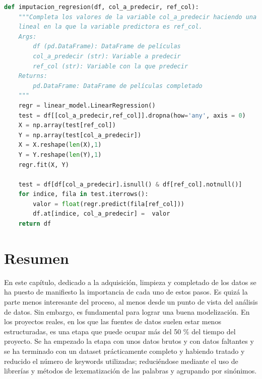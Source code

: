 \begin{lstlisting}[language=Python, caption={Imputación de una variable mediante regresión lineal con otra.}, label ={lst:linreg}]
 def imputacion_regresion(df, col_a_predecir, ref_col):
    """Completa los valores de la variable col_a_predecir haciendo una regresión
    lineal en la que la variable predictora es ref_col.
    Args:
        df (pd.DataFrame): DataFrame de películas
        col_a_predecir (str): Variable a predecir
        ref_col (str): Variable con la que predecir
    Returns:
        pd.DataFrame: DataFrame de películas completado
    """
    regr = linear_model.LinearRegression()
    test = df[[col_a_predecir,ref_col]].dropna(how='any', axis = 0)
    X = np.array(test[ref_col])
    Y = np.array(test[col_a_predecir])
    X = X.reshape(len(X),1)
    Y = Y.reshape(len(Y),1)
    regr.fit(X, Y)

    test = df[df[col_a_predecir].isnull() & df[ref_col].notnull()]
    for indice, fila in test.iterrows():
        valor = float(regr.predict(fila[ref_col]))
        df.at[indice, col_a_predecir] =  valor
    return df
\end{lstlisting}

\section{Resumen}

En este capítulo, dedicado a la adquisición, limpieza y completado de los datos se ha puesto de manifiesto la importancia de cada uno de estos pasos. Es quizá la parte menos interesante del proceso, al menos desde un punto de vista del análisis de datos. Sin embargo, es fundamental para lograr una buena modelización. En los proyectos reales, en los que las fuentes de datos suelen estar menos estructuradas, es una etapa que puede ocupar más del 50 \% del tiempo del proyecto. Se ha empezado la etapa con unos datos brutos y con datos faltantes y se ha terminado con un dataset prácticamente completo y habiendo tratado y reducido el número de keywords utilizadas; reduciéndose mediante el uso de librerías y métodos de lexematización de las palabras y agrupando por sinónimos.